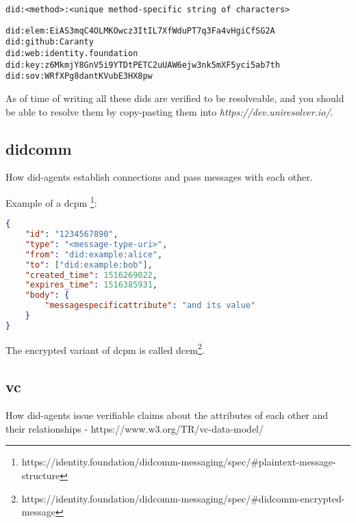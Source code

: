 \begin{lstlisting}[caption={DID-signature}]
did:<method>:<unique method-specific string of characters>
\end{lstlisting}

\begin{lstlisting}[caption={Depending on the DID-method, different DIDs may look very different from each other.}]
did:elem:EiAS3mqC4OLMKOwcz3ItIL7XfWduPT7q3Fa4vHgiCfSG2A
did:github:Caranty
did:web:identity.foundation
did:key:z6MkmjY8GnV5i9YTDtPETC2uUAW6ejw3nk5mXF5yci5ab7th
did:sov:WRfXPg8dantKVubE3HX8pw

\end{lstlisting}

As of time of writing all these \acrshort{dids} are verified to be resolveable, and you should be able to resolve them by copy-pasting them into \textit{https://dev.uniresolver.io/\cite{UniversalResolver}}.

\newpage




\subsection{\acrfull{didcomm}}

How \acrshort{did}-agents establish connections and pass messages with each other.


Example of a \acrfull{dcpm} \footnote{https://identity.foundation/didcomm-messaging/spec/\#plaintext-message-structure}:
\begin{lstlisting}[language=json]
{
    "id": "1234567890",
    "type": "<message-type-uri>",
    "from": "did:example:alice",
    "to": ["did:example:bob"],
    "created_time": 1516269022,
    "expires_time": 1516385931,
    "body": {
    	"messagespecificattribute": "and its value"
    }
}
\end{lstlisting}

The encrypted variant of \acrfull{dcpm} is called \acrfull{dcem}\footnote{https://identity.foundation/didcomm-messaging/spec/#didcomm-encrypted-message}.



\newpage

\subsection{\acrfull{vc}} 

How \acrshort{did}-agents issue verifiable claims about the attributes of each other and their relationships - https://www.w3.org/TR/vc-data-model/ 

